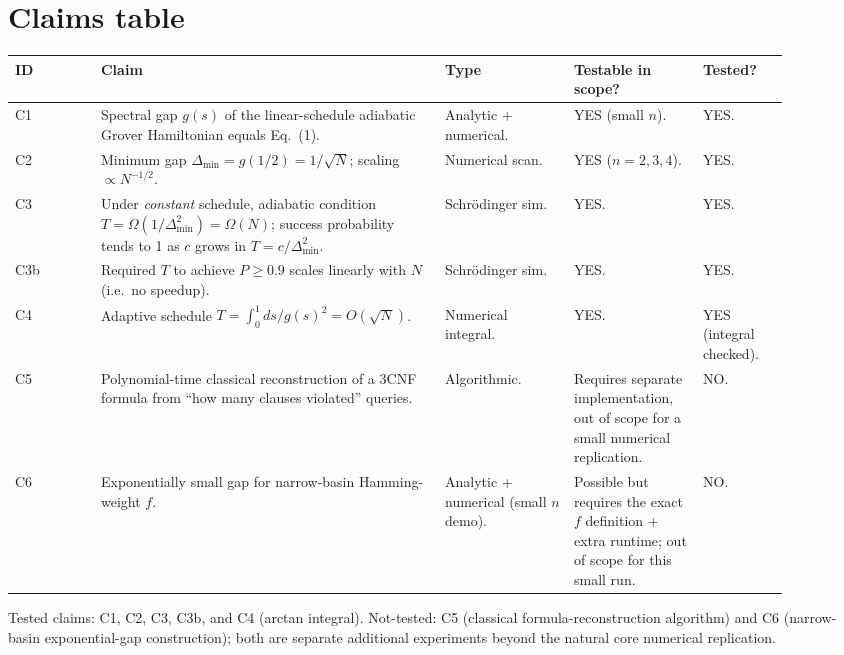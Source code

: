\documentclass[11pt]{article}
\begin{document}
\section{Claims table}
\begin{center}\small
\begin{tabular}{p{0.1\linewidth} p{0.4\linewidth} p{0.15\linewidth} p{0.15\linewidth} p{0.1\linewidth}}
\toprule
ID & Claim & Type & Testable in scope? & Tested?\\
\midrule
C1 & Spectral gap $g(s)$ of the linear-schedule adiabatic Grover Hamiltonian
     equals Eq.~(1). & Analytic + numerical. & YES (small $n$). & YES.\\
C2 & Minimum gap $\Delta_{\min} = g(1/2) = 1/\sqrt{N}$; scaling $\propto N^{-1/2}$. & Numerical scan. & YES ($n{=}2,3,4$). & YES.\\
C3 & Under \emph{constant} schedule, adiabatic condition $T = \Omega(1/\Delta_{\min}^2) = \Omega(N)$; success probability tends to 1 as $c$ grows in $T = c/\Delta_{\min}^2$. & Schr\"odinger sim. & YES. & YES.\\
C3b & Required $T$ to achieve $P \ge 0.9$ scales linearly with $N$ (i.e.\ no speedup). & Schr\"odinger sim. & YES. & YES.\\
C4 & Adaptive schedule $T = \int_0^1 ds/g(s)^2 = O(\sqrt{N})$. & Numerical integral. & YES. & YES (integral checked).\\
C5 & Polynomial-time classical reconstruction of a 3CNF formula from ``how many clauses violated'' queries. & Algorithmic. & Requires separate implementation, out of scope for a small numerical replication. & NO.\\
C6 & Exponentially small gap for narrow-basin Hamming-weight $f$. & Analytic + numerical (small $n$ demo). & Possible but requires the exact $f$ definition + extra runtime; out of scope for this small run. & NO.\\
\bottomrule
\end{tabular}
\end{center}
Tested claims: C1, C2, C3, C3b, and C4 (arctan integral).
Not-tested: C5 (classical formula-reconstruction algorithm) and C6
(narrow-basin exponential-gap construction); both are separate additional
experiments beyond the natural core numerical replication.
\end{document}
